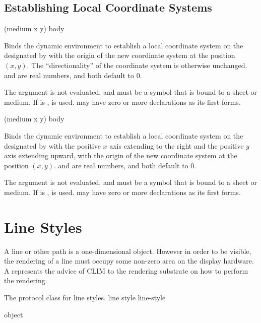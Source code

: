\subsection {Establishing Local Coordinate Systems}

 {(medium \optional x y) \body body}

Binds the dynamic environment to establish a local coordinate system on the
 designated by  with the origin of the new coordinate
system at the position $(x,y)$.  The ``directionality'' of the coordinate system
is otherwise unchanged.   and  are real numbers, and both default
to 0.

The  argument is not evaluated, and must be a symbol that is bound
to a sheet or medium.  If  is ,  is
used.   may have zero or more declarations as its first forms.

 {(medium \optional x y) \body body}

Binds the dynamic environment to establish a local coordinate system on the
 designated by  with the positive $x$ axis extending to
the right and the positive $y$ axis extending upward, with the origin of the new
coordinate system at the position $(x,y)$.   and  are real
numbers, and both default to 0.

The  argument is not evaluated, and must be a symbol that is bound
to a sheet or medium.  If  is ,  is
used.   may have zero or more declarations as its first forms.


\section {Line Styles\label{line-styles}}

A line or other path is a one-dimensional object.  However in order to be
visible, the rendering of a line must occupy some non-zero area on the display
hardware.  A  represents the advice of CLIM to the rendering
substrate on how to perform the rendering.


The protocol class for line styles.
 {line style} {line-style}

 {object}


